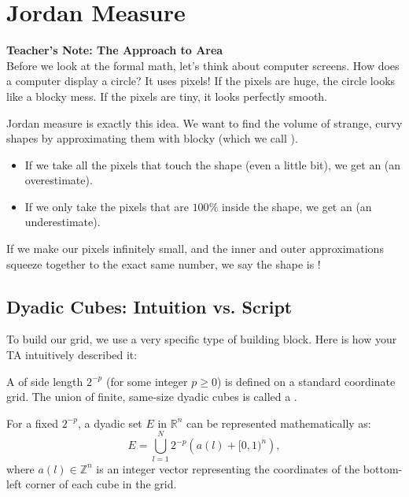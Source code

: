 \section{Jordan Measure} %

\begin{extra}
\textbf{Teacher's Note: The  Approach to Area}\\
Before we look at the formal math, let's think about computer screens. How does a computer display a circle? It uses pixels! If the pixels are huge, the circle looks like a blocky mess. If the pixels are tiny, it looks perfectly smooth. 

Jordan measure is exactly this idea. We want to find the volume of strange, curvy shapes by approximating them with blocky  (which we call ). 
\begin{itemize}
    \item If we take all the pixels that touch the shape (even a little bit), we get an  (an overestimate).
    \item If we only take the pixels that are $100\%$ inside the shape, we get an  (an underestimate).
\end{itemize}
If we make our pixels infinitely small, and the inner and outer approximations squeeze together to the exact same number, we say the shape is !
\end{extra}

\subsection{Dyadic Cubes: Intuition vs. Script}

To build our grid, we use a very specific type of building block. Here is how your TA intuitively described it:

\begin{definition*} %
A  of side length $2^{-p}$ (for some integer $p \ge 0$) is defined on a standard coordinate grid. The union of finite, same-size dyadic cubes is called a . %

For a fixed  $2^{-p}$, a dyadic set $E$ in $\mathbb{R}^n$ can be represented mathematically as: %
\[
E = \bigcup_{l=1}^N 2^{-p}\left(a(l) + [0,1)^n\right), %
\]
where $a(l) \in \mathbb{Z}^n$ is an integer vector representing the coordinates of the bottom-left corner of each cube in the grid. %
\end{definition*}

